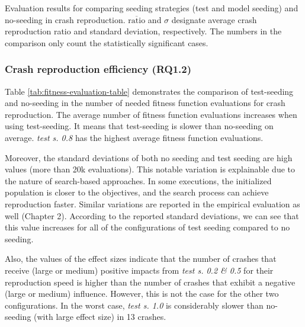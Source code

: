 \begin{table} [t]
	\center
	\caption{Evaluation results for comparing seeding strategies (test and model seeding) and no-seeding in crash reproduction. $\overline{\text{ratio}}$ and $\sigma$  designate average crash reproduction ratio and standard deviation, respectively. The numbers in the comparison only count the statistically significant cases.}
	\label{tab:crash-repr-table}
	\begin{footnotesize}
	\subfloat{}
	\subfloat{}
	
    \end{footnotesize}
\end{table}

\subsubsection{Crash reproduction efficiency (\textbf{RQ1.2})}

Table \ref{tab:fitness-evaluation-table} demonstrates the comparison of test-seeding and no-seeding in the number of needed fitness function evaluations for crash reproduction. The average number of fitness function evaluations increases when using test-seeding. It means that test-seeding is slower than no-seeding on average. \textit{test s. 0.8} has the highest average fitness function evaluations. 

Moreover, the standard deviations of both no seeding and test seeding are high values (more than 20k evaluations). This notable variation is explainable due to the nature of search-based approaches. In some executions, the initialized population is closer to the objectives, and the search process can achieve reproduction faster. Similar variations are reported in the \jcrashpack empirical evaluation as well (Chapter 2). According to the reported standard deviations, we can see that this value increases for all of the configurations of test seeding compared to no seeding.

Also, the values of the effect sizes indicate that the number of crashes that receive (large or medium) positive impacts from \textit{test s. 0.2 \& 0.5} for their reproduction speed is higher than the number of crashes that exhibit a negative (large or medium) influence. However, this is not the case for the other two configurations. In the worst case, \textit{test s. 1.0} is considerably slower than no-seeding (with large effect size)  in 13 crashes.


